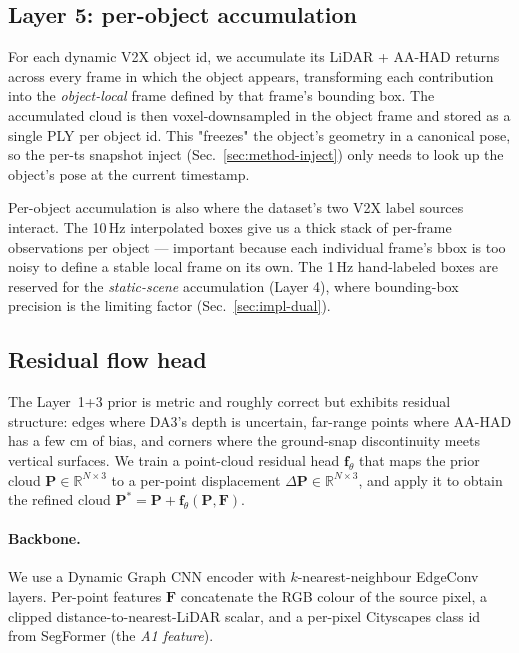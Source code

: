 \documentclass[10pt,twocolumn,letterpaper]{article}
\begin{document}
\subsection{Layer 5: per-object accumulation}
\label{sec:method-perobject}

For each dynamic V2X object id, we accumulate its LiDAR + AA-HAD
returns across every frame in which the object appears, transforming
each contribution into the \emph{object-local} frame defined by that
frame's bounding box. The accumulated cloud is then voxel-downsampled
in the object frame and stored as a single PLY per object id. This
"freezes" the object's geometry in a canonical pose, so the per-ts
snapshot inject (Sec.~\ref{sec:method-inject}) only needs to look up
the object's pose at the current timestamp.

Per-object accumulation is also where the dataset's two V2X label
sources interact. The 10\,Hz interpolated boxes give us a thick stack
of per-frame observations per object — important because each
individual frame's bbox is too noisy to define a stable local frame on
its own. The 1\,Hz hand-labeled boxes are reserved for the
\emph{static-scene} accumulation (Layer 4), where bounding-box
precision is the limiting factor (Sec.~\ref{sec:impl-dual}).


\subsection{Residual flow head}
\label{sec:method-residual}

The Layer~1+3 prior is metric and roughly correct but exhibits
residual structure: edges where DA3's depth is uncertain, far-range
points where AA-HAD has a few cm of bias, and corners where the
ground-snap discontinuity meets vertical surfaces. We train a
point-cloud residual head $\mathbf{f}_\theta$ that maps the prior
cloud $\mathbf{P}\in\mathbb{R}^{N\times 3}$ to a per-point
displacement $\Delta\mathbf{P}\in\mathbb{R}^{N\times 3}$, and apply it
to obtain the refined cloud
$\mathbf{P}^* = \mathbf{P} + \mathbf{f}_\theta(\mathbf{P}, \mathbf{F})$.

\paragraph{Backbone.} We use a Dynamic Graph CNN \cite{dgcnn}
encoder with $k$-nearest-neighbour EdgeConv layers. Per-point features
$\mathbf{F}$ concatenate the RGB colour of the source pixel, a clipped
distance-to-nearest-LiDAR scalar, and a per-pixel Cityscapes class id
from SegFormer \cite{segformer} (the \emph{A1 feature}).
\end{document}
